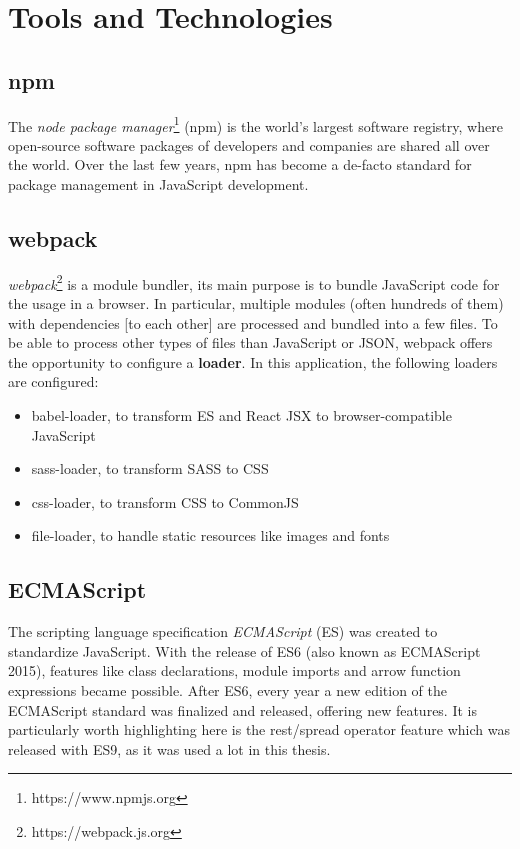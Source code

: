 \documentclass[a4paper,top=25mm,bottom=25mm,12pt,pdftex,halfparskip,twoside,openany,bibtotoc,numbers=noenddot]{scrbook}
\begin{document}
\section{Tools and Technologies}
\subsection{npm}

The \textit{node package manager}\footnote{https://www.npmjs.org} (npm) is the world's largest software registry, where open-source software packages of developers and companies are shared all over the world. Over the last few years, npm has become a de-facto standard for package management in JavaScript development.

\subsection{webpack}

\textit{webpack}\footnote{https://webpack.js.org} is a module bundler, its main purpose is to bundle JavaScript code for the usage in a browser. In particular, multiple modules (often hundreds of them) with dependencies [to each other] are processed and bundled into a few files. To be able to process other types of files than JavaScript or JSON, webpack offers the opportunity to configure a \textbf{loader}. In this application, the following loaders are configured:
\begin{itemize}
\item babel-loader, to transform ES and React JSX to browser-compatible JavaScript
\item sass-loader, to transform SASS to CSS
\item css-loader, to transform CSS to CommonJS
\item file-loader, to handle static resources like images and fonts
\end{itemize}

\subsection{ECMAScript}

The scripting language specification \textit{ECMAScript} (ES) was created to standardize JavaScript. With the release of ES6 (also known as ECMAScript 2015), features like class declarations, module imports and arrow function expressions became possible. After ES6, every year a new edition of the ECMAScript standard was finalized and released, offering new features. It is particularly worth highlighting here is the rest/spread operator feature which was released with ES9, as it was used a lot in this thesis.
\end{document}
